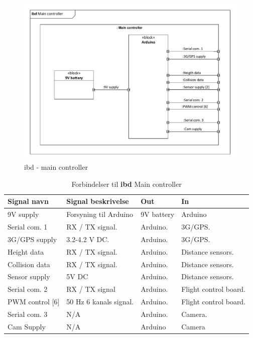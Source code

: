 
\begin{figure}[H]
\centering
\includegraphics[width=1\textwidth]{Billeder/IBD/ibd3_maincontroller.pdf}
\caption{ibd - main controller}
\label{fig:ibd_maincontroller}
\end{figure}

\begin{table}[H]
	\centering
		\begin{tabular}{|p{2.5 cm}|p{5.5 cm}|p{2.5 cm}|p{2.5 cm}|} 
		\hline
			\textbf{Signal navn} 	& \textbf{Signal beskrivelse}		& \textbf{Out} 				& \textbf{In}     \\ \hline
			9V supply & Forsyning til Arduino & 9V battery & Arduino 		    \\ \hline
			Serial com. 1 & RX / TX signal. & Arduino. & 3G/GPS. \\ \hline
			3G/GPS supply & 3.2-4.2 V DC. & Arduino.	& 3G/GPS.	\\ \hline
			Height data & RX / TX signal. & Arduino. & Distance sensors.			    \\ \hline
			Collision data & RX / TX signal. & Arduino. & Distance sensors.			\\ \hline
			Sensor supply & 5V DC & Arduino. & Distance sensors. \\ \hline 
			Serial com. 2 & RX / TX signal & Arduino. & Flight control board. \\ \hline 
			PWM control [6] & 50 Hz 6 kanals signal. & Arduino. & Flight control board. \\ \hline 
			Serial com. 3 & N/A & Arduino. & Camera. \\ \hline 
			Cam Supply & N/A & Arduino & Camera \\ \hline  
		\end{tabular}
	\caption{Forbindelser til \textbf{ibd} Main controller}
	\label{tab:IBDMaincontroller}
\end{table}

